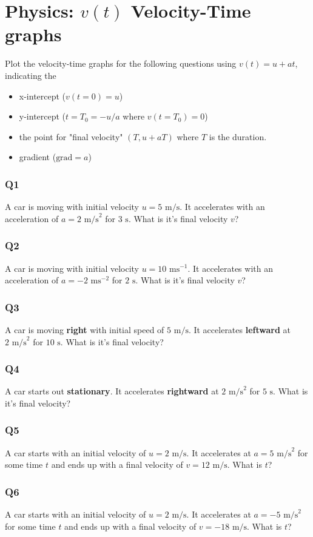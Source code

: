 \documentclass{article}
\begin{document}
\section{Physics: $v(t)$ Velocity-Time graphs}
Plot the velocity-time graphs for the following questions using $v(t)=u+at$, indicating the 
\begin{itemize}
    \item x-intercept ($v(t=0) = u$)
    \item y-intercept ($t=T_0=-u/a$ where $v(t=T_0) = 0$)
    \item the point for "final velocity" $(T,u+aT)$ where $T$ is the duration.
    \item gradient ($\text{grad}=a$)
\end{itemize}
\subsubsection{Q1}
A car is moving with initial velocity $u=5 \text{ m/s}$. It accelerates with an acceleration of $a = 2\text{ m/s}^2$ for $3\text{ s}$. What is it's final velocity $v$?
\subsubsection{Q2}
A car is moving with initial velocity $u=10 \text{ ms}^{-1}$. It accelerates with an acceleration of $a = -2\text{ ms}^{-2}$ for $2\text{ s}$. What is it's final velocity $v$?
\subsubsection{Q3}
A car is moving \textbf{right} with initial speed of $5 \text{ m/s}$. It accelerates \textbf{leftward} at $2\text{ m/s}^2$ for $10\text{ s}$. What is it's final velocity?
\subsubsection{Q4}
A car starts out \textbf{stationary}. It accelerates \textbf{rightward} at $2\text{ m/s}^2$ for $5\text{ s}$. What is it's final velocity?
\subsubsection{Q5}
A car starts with an initial velocity of $u=2 \text{ m/s}$. It accelerates at $a=5\text{ m/s}^2$ for some time $t$ and ends up with a final velocity of $v=12 \text{ m/s}$. What is $t$?
\subsubsection{Q6}
A car starts with an initial velocity of $u=2 \text{ m/s}$. It accelerates at $a=-5\text{ m/s}^2$ for some time $t$ and ends up with a final velocity of $v=-18 \text{ m/s}$. What is $t$?
\end{document}
